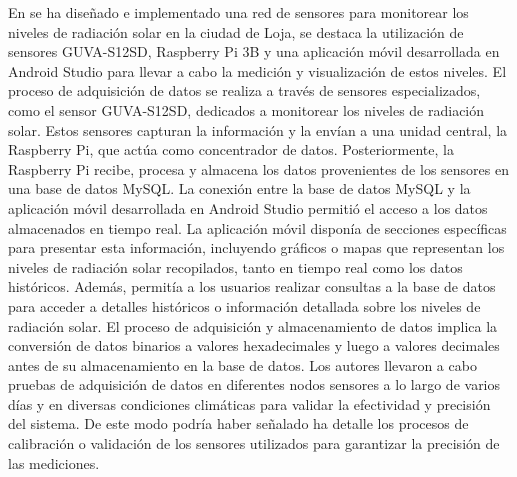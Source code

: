 \bigbreak
En \cite{orozco_jaramillo_diseno_2019} se ha diseñado e implementado una red de sensores para monitorear los niveles de radiación solar en la ciudad de Loja, se destaca la utilización de sensores GUVA-S12SD, Raspberry Pi 3B y una aplicación móvil desarrollada en Android Studio para llevar a cabo la medición y visualización de estos niveles. El proceso de adquisición de datos se realiza a través de sensores especializados, como el sensor GUVA-S12SD, dedicados a monitorear los niveles de radiación solar. Estos sensores capturan la información y la envían a una unidad central, la Raspberry Pi, que actúa como concentrador de datos. Posteriormente, la Raspberry Pi recibe, procesa y almacena los datos provenientes de los sensores en una base de datos MySQL. La conexión entre la base de datos MySQL y la aplicación móvil desarrollada en Android Studio permitió el acceso a los datos almacenados en tiempo real. La aplicación móvil disponía de secciones específicas para presentar esta información, incluyendo gráficos o mapas que representan los niveles de radiación solar recopilados, tanto en tiempo real como los datos históricos. Además, permitía a los usuarios realizar consultas a la base de datos para acceder a detalles históricos o información detallada sobre los niveles de radiación solar. El proceso de adquisición y almacenamiento de datos implica la conversión de datos binarios a valores hexadecimales y luego a valores decimales antes de su almacenamiento en la base de datos. Los autores llevaron a cabo pruebas de adquisición de datos en diferentes nodos sensores a lo largo de varios días y en diversas condiciones climáticas para validar la efectividad y precisión del sistema. De este modo podría haber señalado ha detalle los procesos de calibración o validación de los sensores utilizados para garantizar la precisión de las mediciones.

